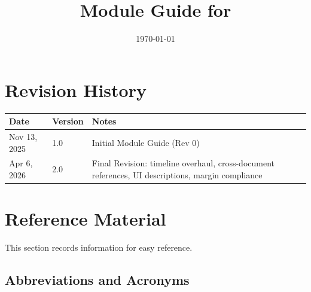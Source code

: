 \documentclass[12pt, titlepage]{article}
\begin{document}
\title{Module Guide for \progname{}} 
\author{\authname}
\date{\today}

\maketitle


\section{Revision History}

\begin{tabularx}{\textwidth}{p{3cm}p{2cm}X}
\toprule {\bf Date} & {\bf Version} & {\bf Notes}\\
\midrule
Nov 13, 2025 & 1.0 & Initial Module Guide (Rev 0)\\
Apr 6, 2026 & 2.0 & Final Revision: timeline overhaul, cross-document references, UI descriptions, margin compliance\\
\bottomrule
\end{tabularx}

\newpage

\section{Reference Material}

This section records information for easy reference.

\subsection{Abbreviations and Acronyms}
\end{document}
